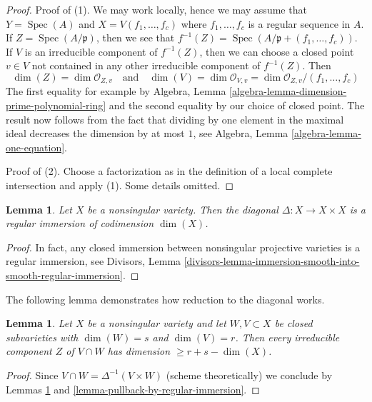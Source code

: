 \documentclass{stacks-project}
\theoremstyle{plain}
\newtheorem{lemma}[subsection]{Lemma}
\theoremstyle{definition}
\theoremstyle{remark}
\numberwithin{equation}{subsection}
\def\Spec{\mathop{\mathrm{Spec}}}
\begin{document}
\begin{proof}
Proof of (1). We may work locally, hence we may assume that
$Y = \Spec(A)$ and $X = V(f_1, \ldots, f_c)$ where $f_1, \ldots, f_c$
is a regular sequence in $A$. If $Z = \Spec(A/\mathfrak p)$, then
we see that $f^{-1}(Z) = \Spec(A/\mathfrak p + (f_1, \ldots, f_c))$.
If $V$ is an irreducible component of $f^{-1}(Z)$, then we can
choose a closed point $v \in V$ not contained in any other irreducible
component of $f^{-1}(Z)$. Then
$$
\dim(Z) = \dim \mathcal{O}_{Z, v}
\quad\text{and}\quad
\dim(V) = \dim \mathcal{O}_{V, v} = \dim \mathcal{O}_{Z, v}/(f_1, \ldots, f_c)
$$
The first equality for example by
Algebra, Lemma \ref{algebra-lemma-dimension-prime-polynomial-ring}
and the second equality by our choice of closed point.
The result now follows from the fact that dividing by one element
in the maximal ideal decreases the dimension by at most $1$, see
Algebra, Lemma \ref{algebra-lemma-one-equation}.

\medskip\noindent
Proof of (2). Choose a factorization as in the definition of a
local complete intersection and apply (1). Some details omitted.
\end{proof}

\begin{lemma}
\label{lemma-diagonal-regular-immersion}
Let $X$ be a nonsingular variety. Then the diagonal
$\Delta : X \to X \times X$ is a regular immersion of codimension $\dim(X)$.
\end{lemma}

\begin{proof}
In fact, any closed immersion between nonsingular projective
varieties is a regular immersion, see Divisors,
Lemma \ref{divisors-lemma-immersion-smooth-into-smooth-regular-immersion}.
\end{proof}

\noindent
The following lemma demonstrates how reduction to the diagonal works.

\begin{lemma}
\label{lemma-intersect-in-smooth}
Let $X$ be a nonsingular variety and let $W,V \subset X$
be closed subvarieties with $\dim(W) = s$ and $\dim(V) = r$. Then every
irreducible component $Z$ of $V \cap W$ has dimension $\geq r + s - \dim(X)$.
\end{lemma}

\begin{proof}
Since $V \cap W = \Delta^{-1}(V \times W)$ (scheme theoretically)
we conclude by Lemmas \ref{lemma-diagonal-regular-immersion} and
\ref{lemma-pullback-by-regular-immersion}.
\end{proof}
\end{document}
